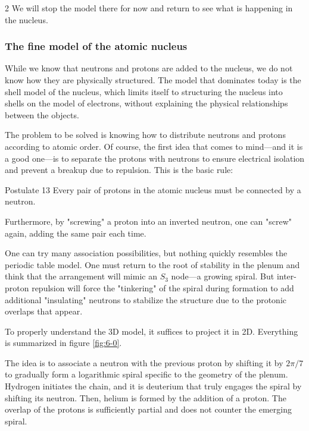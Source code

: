 \begin{multicols}{2}
	We will stop the model there for now and return to see what is happening in the nucleus.
	
	\subsubsection{The fine model of the atomic nucleus}
	
	While we know that neutrons and protons are added to the nucleus, we do not know how they are physically structured. The model that dominates today is the shell model of the nucleus, which limits itself to structuring the nucleus into shells on the model of electrons, without explaining the physical relationships between the objects.
	
	The problem to be solved is knowing how to distribute neutrons and protons according to atomic order. Of course, the first idea that comes to mind—and it is a good one—is to separate the protons with neutrons to ensure electrical isolation and prevent a breakup due to repulsion. This is the basic rule:
	
	\begin{mybox}[breakable,colback=blue!10, colbacktitle=pkcolor]{Postulate 13}
		Every pair of protons in the atomic nucleus must be connected by a neutron.
	\end{mybox}
	\medskip
	
	Furthermore, by "screwing" a proton into an inverted neutron, one can "screw" again, adding the same pair each time.
	
	One can try many association possibilities, but nothing quickly resembles the periodic table model. One must return to the root of stability in the plenum and think that the arrangement will mimic an $S_3$ node—a growing spiral. But inter-proton repulsion will force the "tinkering" of the spiral during formation to add additional "insulating" neutrons to stabilize the structure due to the protonic overlaps that appear.
	
	To properly understand the 3D model, it suffices to project it in 2D. Everything is summarized in figure \ref{fig:6-0}.
	
	The idea is to associate a neutron with the previous proton by shifting it by $2\pi/7$ to gradually form a logarithmic spiral specific to the geometry of the plenum. Hydrogen initiates the chain, and it is deuterium that truly engages the spiral by shifting its neutron. Then, helium is formed by the addition of a proton. The overlap of the protons is sufficiently partial and does not counter the emerging spiral.
	

\end{multicols}
